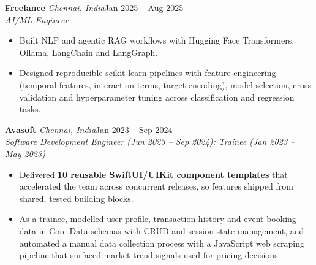 \documentclass[a4paper,11pt]{article}
\newcommand{\role}[4]{%
  \textbf{#1}{\color{muted}\,\textperiodcentered\,\textit{#2}}\hfill{\color{muted}#3}\\
  \textit{#4}\par}
\newcommand{\gap}{\vspace{5pt}}
\newcommand{\num}[1]{\textbf{#1}}   %
\begin{document}
\gap
{}
\role{Freelance}{Chennai, India}{Jan 2025 – Aug 2025}{AI/ML Engineer}
\begin{itemize}
  \item Built NLP and agentic RAG workflows with Hugging Face Transformers, Ollama, LangChain and LangGraph.
  \item Designed reproducible scikit-learn pipelines with feature engineering (temporal features, interaction terms, target encoding), model selection, cross validation and hyperparameter tuning across classification and regression tasks.
\end{itemize}
\gap
{}
\role{Avasoft}{Chennai, India}{Jan 2023 – Sep 2024}{Software Development Engineer (Jun 2023 – Sep 2024); Trainee (Jan 2023 – May 2023)}
\begin{itemize}
  \item Delivered \num{10 reusable SwiftUI/UIKit component templates} that accelerated the team across concurrent releases, so features shipped from shared, tested building blocks.
  \item As a trainee, modelled user profile, transaction history and event booking data in Core Data schemas with CRUD and session state management, and automated a manual data collection process with a JavaScript web scraping pipeline that surfaced market trend signals used for pricing decisions.
\end{itemize}
\end{document}
